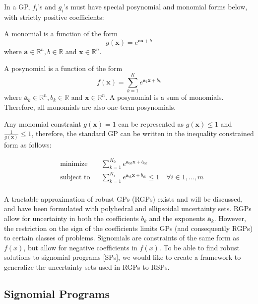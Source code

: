 \documentclass{article}
\renewcommand{\vec}{\mathbf}
\begin{document}
In a GP, $f_{i}$’s and $g_{i}$’s must have special posynomial and monomial forms below, with strictly positive coefficients:

A monomial is a function of the form 
\begin{equation}\label{e:monomial}
g(\mathbf{x}) = e^{\mathbf{a}\mathbf{x} + b}
\end{equation}
where $\mathbf{a} \in \mathbb{R}^n, b \in \mathbb{R}$ and $\mathbf{x} \in \mathbb{R}^n$. 

A posynomial is a function of the form
\begin{equation}\label{e:posynomial}
f(\mathbf{x}) = \sum_{k=1}^{K}e^{\mathbf{a}_k\mathbf{x} + b_k}
\end{equation}
where $\vec{a}_k \in \mathbb{R}^n, b_k \in \mathbb{R}$ and $\vec{x} \in \mathbb{R}^n$. A posynomial is a sum of monomials. Therefore, all monomials are also one-term posynomials.

Any monomial constraint $g(\vec{x}) = 1$ can be represented as $g(\vec{x}) \leq 1$ and $\frac{1}{g(\vec{x})} \leq 1$, therefore, the standard GP can be written in the inequality constrained form as follows:

\begin{equation}
\begin{aligned}
	& \text{minimize} && \textstyle{\sum}_{k=1}^{K_0}e^{\vec{a}_{0k}\vec{x} + b_{0k}} \\
	& \text{subject to} && \textstyle{\sum}_{k=1}^{K_i}e^{\vec{a}_{ik}\vec{x} + b_{ik}} \leq 1 \quad \forall i \in 1,...,m\\
\end{aligned}
\label{GP_inequality}
\end{equation}

A tractable approximation of robust GPs (RGPs) exists and will be discussed, and have been formulated with polyhedral and ellipsoidal uncertainty sets. RGPs allow for uncertainty in both the coefficients $b_k$ and the exponents $\mathbf{a}_{k}$. However, the restriction on the sign of the coefficients limits GPs (and consequently RGPs) to certain classes of problems. Signomials are constraints of the same form as $f(x)$, but allow for negative coefficients in $f(x)$. To be able to find robust solutions to signomial programs [SPs], we would like to create a framework to generalize the uncertainty sets used in RGPs to RSPs.

\subsection{Signomial Programs}
\end{document}
